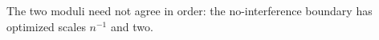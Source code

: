 The two moduli need not agree in order: the no-interference boundary has optimized scales \(n^{-1}\) and two.